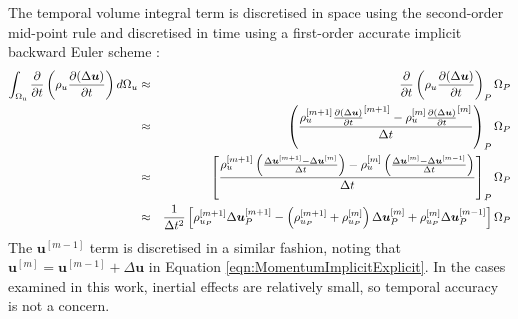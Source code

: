 \documentclass[sn-mathphys,Numbered]{sn-jnl}%
\newcommand{\bb}{\boldsymbol}
\begin{document}
 The temporal volume integral term is discretised in space using the second-order mid-point rule and discretised in time using a first-order accurate implicit backward Euler scheme \cite{jasak_application_2000}:
\begin{eqnarray} \label{eq:timeTerm}
	\int_{\mathrm{\Omega_u}} \frac{\partial }{\partial t} \left( \rho_u \frac{\partial (\Delta \bb{u}) }{\partial t} \right) d\mathrm{\Omega}_u
	&\approx&
	\frac{\partial }{\partial t} \left( \rho_u \frac{\partial (\Delta \bb{u}) }{\partial t} \right)_P \mathrm{\Omega}_P \notag \\
	&\approx&
	\left(
	\frac{ \rho_u^{[m+1]} \frac{\partial (\Delta \bb{u}) }{\partial t}^{[m+1]}
	- \rho_u^{[m]} \frac{\partial (\Delta \bb{u}) }{\partial t}^{[m]}}{ \Delta t } \right)_P
	\mathrm{\Omega}_P \notag \\
	&\approx&
	\left[
	\frac{ \rho_u^{[m+1]} \left(\frac{\Delta \bb{u}^{[m+1]} - \Delta \bb{u}^{[m]}}{\Delta t} \right)
	- \rho_u^{[m]} \left(\frac{\Delta \bb{u}^{[m]} - \Delta \bb{u}^{[m-1]}}{\Delta t} \right)
	}{ \Delta t } 
	\right]_P \mathrm{\Omega}_P \notag \\
	&\approx&
	\frac{1}{\Delta t^2} \left[
	 \rho_{u_P}^{[m+1]} \Delta \bb{u}^{[m+1]}_P
	- \left(\rho_{u_P}^{[m+1]} + \rho_{u_P}^{[m]} \right)  \Delta \bb{u}^{[m]}_P
	+ \rho_{u_P}^{[m]}  \Delta \bb{u}^{[m-1]}_P
	\right]
	 \mathrm{\Omega}_P \notag \\
\end{eqnarray}
The $\boldsymbol{u}^{[m-1]}$ term is discretised in a similar fashion, noting that $\boldsymbol{u}^{[m]} = \boldsymbol{u}^{[m-1]} + \Delta \boldsymbol{u}$ in Equation \ref{eqn:MomentumImplicitExplicit}.
In the cases examined in this work, inertial effects are relatively small, so temporal accuracy is not a concern.
\end{document}
